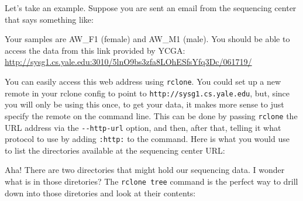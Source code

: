 \documentclass[]{krantz}
\makeatletter
\newenvironment{Shaded}{\begin{snugshade}}{\end{snugshade}}
\newcommand{\CommentTok}[1]{\textcolor[rgb]{0.37,0.37,0.37}{\textit{#1}}}
\newcommand{\ExtensionTok}[1]{#1}
\newcommand{\NormalTok}[1]{#1}
\renewenvironment{quote}{\begin{VF}}{\end{VF}}
\newenvironment{kframe}{%
\medskip{}
\setlength{\fboxsep}{.8em}
 \def\at@end@of@kframe{}%
 \ifinner\ifhmode%
  \def\at@end@of@kframe{\end{minipage}}%
  \begin{minipage}{\columnwidth}%
 \fi\fi%
 \def\FrameCommand##1{\hskip\@totalleftmargin \hskip-\fboxsep
 \colorbox{shadecolor}{##1}\hskip-\fboxsep
     \hskip-\linewidth \hskip-\@totalleftmargin \hskip\columnwidth}%
 \MakeFramed {\advance\hsize-\width
   \@totalleftmargin\z@ \linewidth\hsize
   \@setminipage}}%
 {\par\unskip\endMakeFramed%
 \at@end@of@kframe}
\renewenvironment{Shaded}{\begin{kframe}}{\end{kframe}}
\makeatother
\begin{document}
Let's take an example. Suppose you are sent an email from the sequencing
center that says something like:

\begin{quote}
Your samples are AW\_F1 (female) and AW\_M1 (male).
You should be able to access the data from this link provided by YCGA:
\url{http://sysg1.cs.yale.edu:3010/5lnO9bs3zfa8LOhESfsYfq3Dc/061719/}
\end{quote}

You can easily access this web address using \texttt{rclone}. You could set up a new
remote in your rclone config to point to \texttt{http://sysg1.cs.yale.edu},
but, since you will only be using this once, to get your data, it makes
more sense to just specify the remote on the command line. This can be
done by passing \texttt{rclone} the URL address via the \texttt{-\/-http-url} option, and
then, after that, telling it what protocol to use by adding \texttt{:http:} to
the command. Here is what you would use to list the directories available
at the sequencing center URL:

\begin{Shaded}
\end{Shaded}

Aha! There are two directories that might hold our sequencing data.
I wonder what is in those diretories? The \texttt{rclone\ tree} command is the
perfect way to drill down into those diretories and look at their contents:
\end{document}
